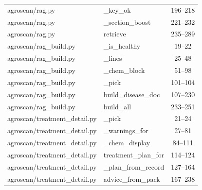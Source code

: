 \begin{center}
\begin{longtable}{@{}p{4.6cm}p{5.2cm}c@{}}
agroscan/rag.py & \_key\_ok & 196--218 \\
agroscan/rag.py & \_section\_boost & 221--232 \\
agroscan/rag.py & retrieve & 235--289 \\
agroscan/rag\_build.py & \_is\_healthy & 19--22 \\
agroscan/rag\_build.py & \_lines & 25--48 \\
agroscan/rag\_build.py & \_chem\_block & 51--98 \\
agroscan/rag\_build.py & \_pick & 101--104 \\
agroscan/rag\_build.py & build\_disease\_doc & 107--230 \\
agroscan/rag\_build.py & build\_all & 233--251 \\
agroscan/treatment\_detail.py & \_pick & 21--24 \\
agroscan/treatment\_detail.py & \_warnings\_for & 27--81 \\
agroscan/treatment\_detail.py & \_chem\_display & 84--111 \\
agroscan/treatment\_detail.py & treatment\_plan\_for & 114--124 \\
agroscan/treatment\_detail.py & \_plan\_from\_record & 127--164 \\
agroscan/treatment\_detail.py & advice\_from\_pack & 167--238 \\
\bottomrule
\end{longtable}
\end{center}